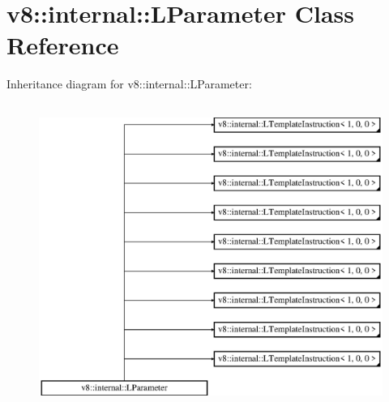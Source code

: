 \hypertarget{classv8_1_1internal_1_1_l_parameter}{}\section{v8\+:\+:internal\+:\+:L\+Parameter Class Reference}
\label{classv8_1_1internal_1_1_l_parameter}
Inheritance diagram for v8\+:\+:internal\+:\+:L\+Parameter\+:\begin{figure}[H]
\begin{center}
\leavevmode
\includegraphics[height=10.000000cm]{classv8_1_1internal_1_1_l_parameter}
\end{center}
\end{figure}
